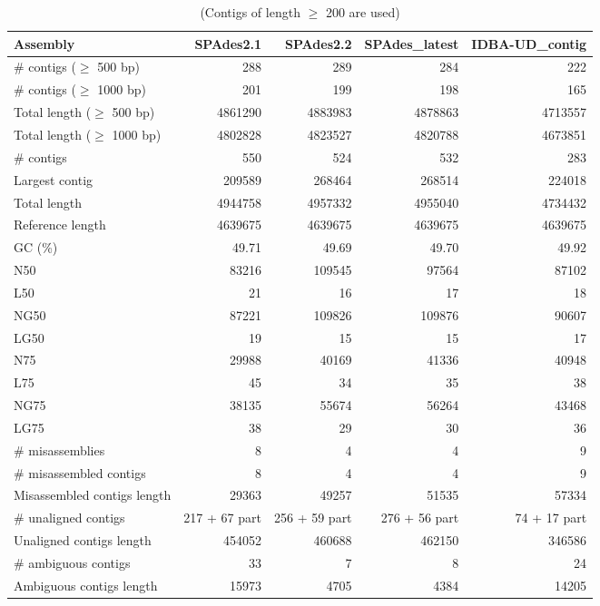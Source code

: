 \begin{table}[ht]
\begin{center}
\caption{(Contigs of length $\geq$ 200 are used)}
\begin{tabular}{|l*{4}{|r}|}
\hline
Assembly & SPAdes2.1 & SPAdes2.2 & SPAdes\_latest & IDBA-UD\_contig \\ \hline
\# contigs ($\geq$ 500 bp) & 288 & 289 & 284 & 222 \\ \hline
\# contigs ($\geq$ 1000 bp) & 201 & 199 & 198 & 165 \\ \hline
Total length ($\geq$ 500 bp) & 4861290 & 4883983 & 4878863 & 4713557 \\ \hline
Total length ($\geq$ 1000 bp) & 4802828 & 4823527 & 4820788 & 4673851 \\ \hline
\# contigs & 550 & 524 & 532 & 283 \\ \hline
Largest contig & 209589 & 268464 & 268514 & 224018 \\ \hline
Total length & 4944758 & 4957332 & 4955040 & 4734432 \\ \hline
Reference length & 4639675 & 4639675 & 4639675 & 4639675 \\ \hline
GC (\%) & 49.71 & 49.69 & 49.70 & 49.92 \\ \hline
N50 & 83216 & 109545 & 97564 & 87102 \\ \hline
L50 & 21 & 16 & 17 & 18 \\ \hline
NG50 & 87221 & 109826 & 109876 & 90607 \\ \hline
LG50 & 19 & 15 & 15 & 17 \\ \hline
N75 & 29988 & 40169 & 41336 & 40948 \\ \hline
L75 & 45 & 34 & 35 & 38 \\ \hline
NG75 & 38135 & 55674 & 56264 & 43468 \\ \hline
LG75 & 38 & 29 & 30 & 36 \\ \hline
\# misassemblies & 8 & 4 & 4 & 9 \\ \hline
\# misassembled contigs & 8 & 4 & 4 & 9 \\ \hline
Misassembled contigs length & 29363 & 49257 & 51535 & 57334 \\ \hline
\# unaligned contigs & 217 + 67 part & 256 + 59 part & 276 + 56 part & 74 + 17 part \\ \hline
Unaligned contigs length & 454052 & 460688 & 462150 & 346586 \\ \hline
\# ambiguous contigs & 33 & 7 & 8 & 24 \\ \hline
Ambiguous contigs length & 15973 & 4705 & 4384 & 14205 \\ \hline

\end{tabular}
\end{center}
\end{table}
